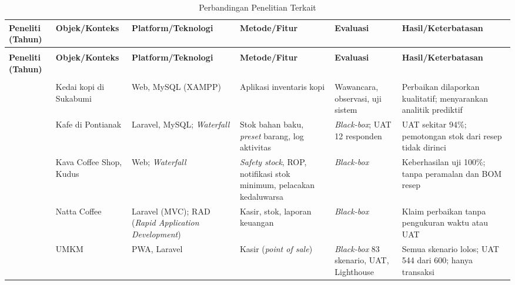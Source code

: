\begin{landscape}
{\scriptsize
{}
\setlength{\tabcolsep}{3pt}
\renewcommand{\arraystretch}{1.1}
\begin{longtable}{@{}>{\raggedright\arraybackslash}p{2.8cm}>{\raggedright\arraybackslash}p{3.1cm}>{\raggedright\arraybackslash}p{3.0cm}>{\raggedright\arraybackslash}p{4.4cm}>{\raggedright\arraybackslash}p{3.6cm}>{\raggedright\arraybackslash}p{5.6cm}@{}}
\caption{Perbandingan Penelitian Terkait}
\label{tab:penelitian-terkait} \\
\toprule
\textbf{Peneliti (Tahun)} & \textbf{Objek/Konteks} & \textbf{Platform/Teknologi} & \textbf{Metode/Fitur} & \textbf{Evaluasi} & \textbf{Hasil/Keterbatasan} \\
\midrule
\endfirsthead
\multicolumn{6}{@{}l}{\small\textit{Tabel~\ref{tab:penelitian-terkait} (lanjutan)}} \\
\toprule
\textbf{Peneliti (Tahun)} & \textbf{Objek/Konteks} & \textbf{Platform/Teknologi} & \textbf{Metode/Fitur} & \textbf{Evaluasi} & \textbf{Hasil/Keterbatasan} \\
\midrule
\endhead
\midrule
\multicolumn{6}{@{}r}{\small\textit{bersambung ke halaman berikutnya}} \\
\endfoot
\bottomrule
\endlastfoot
\citet*{alifadillah2023web} & Kedai kopi di Sukabumi & Web, MySQL (XAMPP) & Aplikasi inventaris kopi & Wawancara, observasi, uji sistem & Perbaikan dilaporkan kualitatif; menyarankan analitik prediktif \\
\addlinespace
\citet*{abdur2026sistem} & Kafe di Pontianak & Laravel, MySQL; \textit{Waterfall} & Stok bahan baku, \textit{preset} barang, log aktivitas & \textit{Black-box}; UAT 12 responden & UAT sekitar 94\%; pemotongan stok dari resep tidak dirinci \\
\addlinespace
\citet*{taufiq2025implementation} & Kava Coffee Shop, Kudus & Web; \textit{Waterfall} & \textit{Safety stock}, ROP, notifikasi stok minimum, pelacakan kedaluwarsa & \textit{Black-box} & Keberhasilan uji 100\%; tanpa peramalan dan BOM resep \\
\addlinespace
\citet*{rusmara2025pengembangan} & Natta Coffee & Laravel (MVC); RAD (\textit{Rapid Application Development}) & Kasir, stok, laporan keuangan & \textit{Black-box} & Klaim perbaikan tanpa pengukuran waktu atau UAT \\
\addlinespace
\citet*{prayudha2024rancang} & UMKM & PWA, Laravel & Kasir (\textit{point of sale}) & \textit{Black-box} 83 skenario, UAT, Lighthouse & Semua skenario lolos; UAT 544 dari 600; hanya transaksi \\

\end{longtable}}
\end{landscape}
